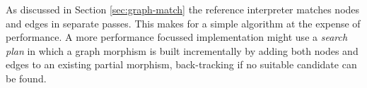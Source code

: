 As discussed in Section \ref{sec:graph-match} the reference interpreter matches nodes and edges in separate passes. This makes for a simple algorithm at the expense of performance. A more performance focussed implementation might use a \textit{search plan}\cite{Horvath-Varro07} in which a graph morphism is built incrementally by adding both nodes and edges to an existing partial morphism, back-tracking if no suitable candidate can be found.












